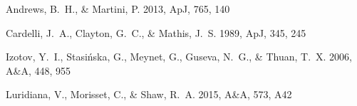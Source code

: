\documentclass[twocolumn]{aastex702}
\begin{document}

\begin{thebibliography}{}

 Andrews, B.~H., \&
Martini, P. 2013, ApJ, 765, 140

 Cardelli, J.~A., Clayton, G.~C.,
\& Mathis, J.~S. 1989, ApJ, 345, 245

 Izotov, Y.~I., Stasi\'nska, G.,
Meynet, G., Guseva, N.~G., \& Thuan, T.~X. 2006, A\&A, 448, 955

 Luridiana, V., Morisset, C., \&
Shaw, R.~A. 2015, A\&A, 573, A42

\end{thebibliography}

\end{document}
